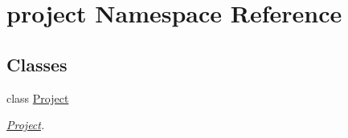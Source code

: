 \hypertarget{namespaceproject}{\section{project Namespace Reference}
\label{namespaceproject}
}
\subsection*{Classes}
\begin{DoxyCompactItemize}
\item 
class \hyperlink{classproject_1_1Project}{Project}
\begin{DoxyCompactList}\small\item\em \hyperlink{classproject_1_1Project}{Project}. \end{DoxyCompactList}\end{DoxyCompactItemize}
